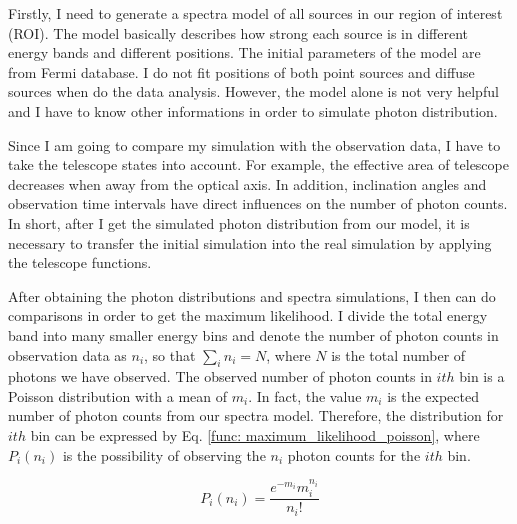 \documentclass[12pt]{report}
\begin{document}
          Firstly, I need to generate a spectra model of all sources in our region of 
          interest (ROI). The model basically describes how strong each source is in 
          different energy bands and different positions. The initial parameters of the 
          model are from Fermi database. I do not fit positions of both point sources and 
          diffuse sources when do the data analysis. However, the model alone is not very 
          helpful and I have to know other informations in order to simulate photon 
          distribution. 

          Since I am going to compare my simulation with the observation data, I have to take 
          the telescope states into account. For example, the effective area of telescope 
          decreases when away from the optical axis. In addition, inclination angles and 
          observation time intervals have direct influences on the number of photon counts. 
          In short, after I get the simulated photon distribution from our model, it is 
          necessary to transfer the initial simulation into the real simulation by applying 
          the telescope functions. 
          
          After obtaining the photon distributions and spectra simulations, 
          I then can do comparisons in order to get the maximum likelihood. I divide the 
          total energy band into many smaller energy bins and denote
          the number of photon counts in observation data as $n_{i}$, so that 
          $\sum_{i}^{}n_{i} = N$, where $N$ is the total number of photons we have observed. 
          The observed number of photon counts in $ith$ bin is a Poisson distribution with a 
          mean of $m_{i}$. In fact, the value $m_{i}$ is the expected number of photon counts 
          from our spectra model. Therefore, the distribution for $ith$
          bin can be expressed by Eq. \ref{func: maximum_likelihood_poisson}, where 
          $P_{i}\left(n_{i}\right)$ is the possibility of observing the $n_{i}$ photon counts 
          for the $ith$ bin. 

          \begin{equation}
            P_{i}\left(n_{i}\right) = \frac{e^{-m_{i}} m_{i}^{n_{i}}}{n_{i}!}
            \label{func: maximum_likelihood_poisson}
          \end{equation}
\end{document}
